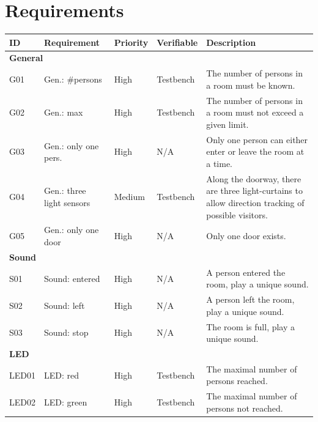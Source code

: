 \documentclass[12pt,a4 paper] {report}
\begin{document}
\newpage

\chapter{Requirements}
\begin{center}
	\begin{tabular}{|p{1.5cm}|p{3.5cm}|p{1.5cm}|p{2cm}|p{5.5cm}|}
		\hline
		\textbf{ID} & \textbf{Requirement} & \textbf{Priority} & \textbf{Verifiable} & \textbf{Description} \\
		\hline
		\multicolumn{5}{|l|}{\textbf{General}} \\
		\hline
		G01 & Gen.: \#persons & High & Testbench & The number of persons in a room must be known. \\
		\hline
		G02 & Gen.: max & High & Testbench & The number of persons in a room must not exceed a given limit. \\
		\hline
		G03 & Gen.: only one pers. & High & N/A & Only one person can either enter or leave the room at a time. \\
		\hline
		G04 & Gen.: three light sensors & Medium & Testbench & Along the doorway, there are three light-curtains to allow direction tracking of possible visitors. \\
		\hline
		G05 & Gen.: only one door & High & N/A & Only one door exists. \\
		\hline
		\multicolumn{5}{|l|}{\textbf{Sound}} \\
		\hline
		S01 & Sound: entered & High & N/A & A person entered the room, play a unique sound. \\
		\hline
		S02 & Sound: left & High & N/A & A person left the room, play a unique sound. \\
		\hline
		S03 & Sound: stop & High & N/A & The room is full, play a unique sound. \\
		\hline
		\multicolumn{5}{|l|}{\textbf{LED}} \\
		\hline
		LED01 & LED: red & High & Testbench & The maximal number of persons reached. \\
		\hline
		LED02 & LED: green & High & Testbench & The maximal number of persons not reached. \\
		\hline
	\end{tabular}
\end{center}
\end{document}
